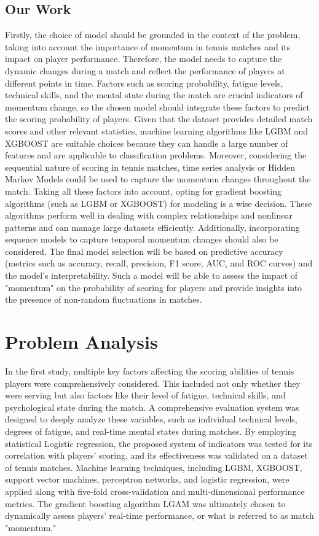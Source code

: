 \documentclass{article}
\begin{document}
\subsection{Our Work}
Firstly, the choice of model should be grounded in the context of the problem, taking into account the importance of momentum in tennis matches and its impact on player performance. Therefore, the model needs to capture the dynamic changes during a match and reflect the performance of players at different points in time. Factors such as scoring probability, fatigue levels, technical skills, and the mental state during the match are crucial indicators of momentum change, so the chosen model should integrate these factors to predict the scoring probability of players. Given that the dataset provides detailed match scores and other relevant statistics, machine learning algorithms like LGBM and XGBOOST are suitable choices because they can handle a large number of features and are applicable to classification problems. Moreover, considering the sequential nature of scoring in tennis matches, time series analysis or Hidden Markov Models could be used to capture the momentum changes throughout the match.
Taking all these factors into account, opting for gradient boosting algorithms (such as LGBM or XGBOOST) for modeling is a wise decision. These algorithms perform well in dealing with complex relationships and nonlinear patterns and can manage large datasets efficiently. Additionally, incorporating sequence models to capture temporal momentum changes should also be considered. The final model selection will be based on predictive accuracy (metrics such as accuracy, recall, precision, F1 score, AUC, and ROC curves) and the model's interpretability. Such a model will be able to assess the impact of "momentum" on the probability of scoring for players and provide insights into the presence of non-random fluctuations in matches.
\section{Problem Analysis}
In the first study, multiple key factors affecting the scoring abilities of tennis players were comprehensively considered. This included not only whether they were serving but also factors like their level of fatigue, technical skills, and psychological state during the match. A comprehensive evaluation system was designed to deeply analyze these variables, such as individual technical levels, degrees of fatigue, and real-time mental states during matches. By employing statistical Logistic regression, the proposed system of indicators was tested for its correlation with players' scoring, and its effectiveness was validated on a dataset of tennis matches. Machine learning techniques, including LGBM, XGBOOST, support vector machines, perceptron networks, and logistic regression, were applied along with five-fold cross-validation and multi-dimensional performance metrics. The gradient boosting algorithm LGAM was ultimately chosen to dynamically assess players' real-time performance, or what is referred to as match "momentum."
\end{document}
